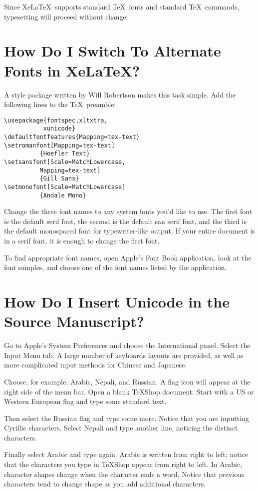 \documentclass[11pt, oneside]{amsart}
\begin{document}
\begin{multicols}{2}
Since Xe\LaTeX\ supports standard \TeX\ fonts and standard \TeX\ commands, typesetting will proceed without change.

\section{How Do I Switch To Alternate Fonts in Xe\LaTeX?}

A style package written by Will Robertson makes this task simple. Add the following lines to the \TeX\ preamble:
\begin{verbatim}
\usepackage{fontspec,xltxtra,
           xunicode}
\defaultfontfeatures{Mapping=tex-text}
\setromanfont[Mapping=tex-text]
          {Hoefler Text}
\setsansfont[Scale=MatchLowercase,
          Mapping=tex-text]
          {Gill Sans}
\setmonofont[Scale=MatchLowercase]
          {Andale Mono}
\end{verbatim}
Change the three font names to any system fonts you'd like to use. The first font is the default serif font, the second is the default san serif font, and the third is the default monospaced font for typewriter-like output. If your entire document is in a serif font, it is enough to change the first font.

To find appropriate font names, open Apple's Font Book application, look at the font samples, and choose one of the font names listed by the application.

\section{How Do I Insert Unicode in the Source Manuscript?}

Go to Apple's System Preferences and choose the International panel. Select the Input Menu tab. A large number of keyboards layouts are provided, as well as more complicated input methods for Chinese and Japanese. 

Choose, for example, Arabic, Nepali, and Russian. A flag icon will appear at the right side of the menu bar. Open a blank TeXShop document. Start with a US or Western European flag and type some standard text.

Then select the Russian flag and type some more. Notice that you are inputting Cyrillic characters. Select Nepali and type another line, noticing the distinct characters. 

Finally select Arabic and type again. Arabic is written from right to left; notice that the characters you type in TeXShop appear from right to left. In Arabic, character shapes change when the character ends a word, Notice that previous characters tend to change shape as you add additional characters.


\end{multicols}
\end{document}
